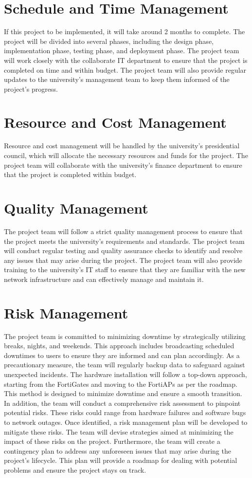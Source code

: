 \documentclass[12pt]{report}
\begin{document}
\section{Schedule and Time Management}
If this project to be implemented, it will take around 2 months to complete. The project will be divided into several phases, including the design phase, implementation phase, testing phase, and deployment phase. The project team will work closely with the collaborate IT department to ensure that the project is completed on time and within budget. The project team will also provide regular updates to the university's management team to keep them informed of the project's progress.
\section{Resource and Cost Management}
Resource and cost management will be handled by the university's presidential council, which will allocate the necessary resources and funds for the project. The project team will collaborate with the university's finance department to ensure that the project is completed within budget.
\section{Quality Management}
The project team will follow a strict quality management process to ensure that the project meets the university's requirements and standards. The project team will conduct regular testing and quality assurance checks to identify and resolve any issues that may arise during the project. The project team will also provide training to the university's IT staff to ensure that they are familiar with the new network infrastructure and can effectively manage and maintain it.
\section{Risk Management}
The project team is committed to minimizing downtime by strategically utilizing breaks, nights, and weekends. This approach includes broadcasting scheduled downtimes to users to ensure they are informed and can plan accordingly. As a precautionary measure, the team will regularly backup data to safeguard against unexpected incidents. The hardware installation will follow a top-down approach, starting from the FortiGates and moving to the FortiAPs as per the roadmap. This method is designed to minimize downtime and ensure a smooth transition. In addition, the team will conduct a comprehensive risk assessment to pinpoint potential risks. These risks could range from hardware failures and software bugs to network outages. Once identified, a risk management plan will be developed to mitigate these risks. The team will devise strategies aimed at minimizing the impact of these risks on the project. Furthermore, the team will create a contingency plan to address any unforeseen issues that may arise during the project's lifecycle. This plan will provide a roadmap for dealing with potential problems and ensure the project stays on track.
\end{document}
